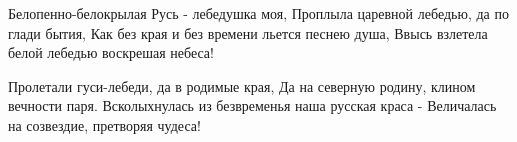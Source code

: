 Белопенно-белокрылая Русь - лебедушка моя,
Проплыла царевной лебедью, да по глади бытия,
Как без края и без времени льется песнею душа,
Ввысь взлетела белой лебедью воскрешая небеса!

Пролетали гуси-лебеди, да в родимые края,
Да на северную родину, клином вечности паря.
Всколыхнулась из безвременья наша русская краса -
Величалась на созвездие, претворяя чудеса!
 
